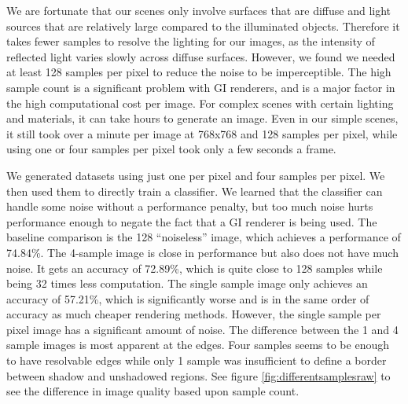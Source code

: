 \documentclass[10pt,twocolumn,letterpaper]{article}
\begin{document}
We are fortunate that our scenes only involve surfaces that are diffuse and light sources that are relatively large compared to the illuminated objects.  Therefore it takes fewer samples to resolve the lighting for our images, as the intensity of reflected light varies slowly across diffuse surfaces.  However, we found we needed at least 128 samples per pixel to reduce the noise to be imperceptible. The high sample count is a significant problem with GI renderers, and is a major factor in the high computational cost per image.  For complex scenes with certain lighting and materials, it can take hours to generate an image.  Even in our simple scenes, it still took over a minute per image at 768x768 and 128 samples per pixel, while using one or four samples per pixel took only a few seconds a frame.

We generated datasets using just one per pixel and four samples per pixel. We then used them to directly train a classifier.  We learned that the classifier can handle some noise without a performance penalty,  but too much noise hurts performance enough to negate the fact that a GI renderer is being used.  The baseline comparison is the 128 ``noiseless'' image, which achieves a performance of 74.84\%.  The 4-sample image is close in performance but also does not have much noise.  It gets an accuracy of 72.89\%, which is quite close to 128 samples while being 32 times less computation.  The single sample image only achieves an accuracy of 57.21\%, which is significantly worse and is in the same order of accuracy as much cheaper rendering methods.  However, the single sample per pixel image has a significant amount of noise.  The difference between the 1 and 4 sample images is most apparent at the edges. Four samples seems to be enough to have resolvable edges while only 1 sample was insufficient to define a border between shadow and unshadowed regions. See figure \ref{fig:differentsamplesraw} to see the difference in image quality based upon sample count. 
\end{document}
